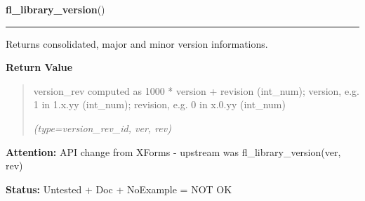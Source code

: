 \hspace{.8\funcindent}\begin{boxedminipage}{\funcwidth}

    \raggedright \textbf{fl\_library\_version}()

    \vspace{-1.5ex}

    \rule{\textwidth}{0.5\fboxrule}
\setlength{\parskip}{2ex}
    Returns consolidated, major and minor version informations.

\setlength{\parskip}{1ex}
      \textbf{Return Value}
    \vspace{-1ex}

      \begin{quote}
      version\_rev computed as 1000 * version + revision (int\_num); 
      version, e.g. 1 in 1.x.yy (int\_num); revision, e.g. 0 in x.0.yy 
      (int\_num)

      {\it (type=version\_rev\_id, ver, rev)}

      \end{quote}

\textbf{Attention:} API change from XForms - upstream was fl\_library\_version(ver, rev)



\textbf{Status:} Untested + Doc + NoExample = NOT OK



    \end{boxedminipage}

    \label{xformslib:library:fl_bgn_form}

    \vspace{0.5ex}

